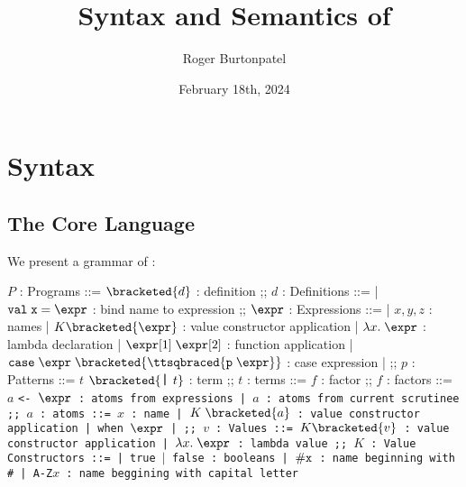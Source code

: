 \documentclass[]{article}
\title{Syntax and Semantics of \PPlus}
\author{Roger Burtonpatel}
\date{February 18th, 2024}
\begin{document}
\maketitle

\section{Syntax}

\subsection{The Core Language}

We present a grammar of \PPlus: 

\bigskip

\begin{center}
    \begin{bnf}
    $P$ : \textsf{Programs} ::=
    $\bracketed{d}$ : definition
    ;;
    $d$ : \textsf{Definitions} ::=
    | $\tt{val} \; x \; \tt{=} \; \expr$ : bind name to expression
    ;;
    $\expr$ : Expressions ::= 
    | $x, y, z$ : names
    | $K\bracketed{\expr}$ : value constructor application 
    | $\lambda x. \; \expr$ : lambda declaration  
    | $\expr[1] \; \expr[2]$ : function application 
    | $\tt{case} \; \expr \; \bracketed{\ttsqbraced{p \; \expr}}$ : case expression 
    | \ttbraced{$\expr$}
    ;;
    $p$ : \textsf{Patterns} ::= $t$ $\bracketed{\text{\large\texttt{\char`\|}}\mskip6mu t}$ : term
    ;;
    $t$ : terms ::= $f$  : factor
    ;;
    $f$ : factors ::= $a$ \tt{<-} $\expr$ : atoms from expressions 
        | $a$ : atoms from current scrutinee
    ;;
    $a$ : atoms ::= $x$ : name 
    | $K \; \bracketed{a}$ : value constructor application 
    | \tt{when} $\expr$
    | 
    ;;
    $v$ : Values ::= $K\bracketed{v}$ : value constructor application 
    | $\lambda x. \; \expr$ : lambda value 
    ;;
    $K$ : \textsf{Value Constructors} ::=
    | \tt{true} $\vert$ \tt{false} : booleans
    | $\tt{\#}x$ : name beginning with \tt{\#}
    | \tt{A-Z}$x$ : name beggining with capital letter
    \end{bnf}
\end{center}
\end{document}
